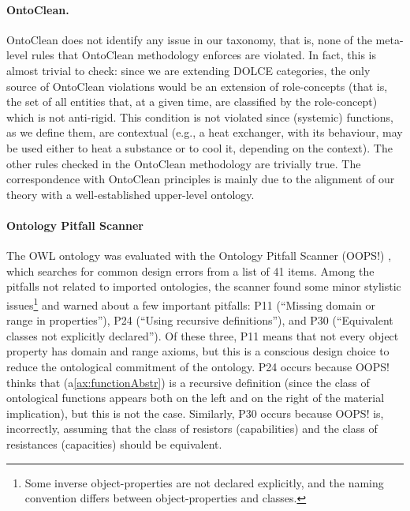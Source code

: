 \documentclass[sw]{iosart2x}
\newcommand{\AxLabel}{\textrm{a}}
\newcommand{\refax}[1]{({\AxLabel}\ref{#1})}
\newcommand{\DOLCE}{\textsc{DOLCE}\xspace} %
\newcommand{\OWL}{\textnormal{OWL}\xspace}
\newcommand{\qquotes}[1]{``#1''}
\begin{document}
\paragraph{OntoClean.} OntoClean does not identify any issue in our taxonomy, that is, none of the meta-level rules that OntoClean methodology enforces are violated.
In fact, this is almost trivial to check: since we are extending \DOLCE categories, the only source of OntoClean violations would be an extension of role-concepts (that is, the set of all entities that, at a given time, are classified by the role-concept) which is not anti-rigid. 
This condition is not violated since (systemic) functions, as we define them, are contextual (e.g., a heat exchanger, with its behaviour, may be used either to heat a substance or to cool it, depending on the context). The other rules checked in the OntoClean methodology are trivially true. 
The correspondence with OntoClean principles is mainly due to the alignment of our theory with a well-established upper-level ontology. 

\paragraph{Ontology Pitfall Scanner} The \OWL ontology was evaluated with the Ontology Pitfall Scanner (OOPS!) \cite{poveda2014oops}, which searches for common design errors from a list of 41 items. Among the pitfalls not related to imported ontologies, the scanner found some minor stylistic issues\footnote{Some inverse object-properties are not declared explicitly, and the naming convention differs between object-properties and classes.} and warned about a few important pitfalls: P11 (\qquotes{Missing domain or range in properties}), P24 (\qquotes{Using recursive definitions}), and P30 (\qquotes{Equivalent classes not explicitly declared}). Of these three, P11 means that not every object property has domain and range axioms, but this is a conscious design choice to reduce the ontological commitment of the ontology. P24 occurs because OOPS! thinks that \refax{ax:functionAbstr} is a recursive definition (since the class of ontological functions appears both on the left and on the right of the material implication), but this is not the case. 
Similarly, P30 occurs because OOPS! is, incorrectly, assuming that the class of resistors (capabilities) and the class of resistances (capacities) should be equivalent. 
\end{document}
